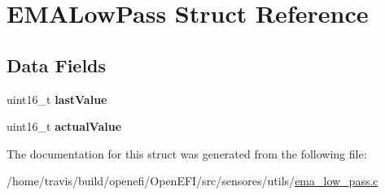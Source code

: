 \hypertarget{structEMALowPass}{}\section{E\+M\+A\+Low\+Pass Struct Reference}
\label{structEMALowPass}
\subsection*{Data Fields}
\begin{DoxyCompactItemize}
\item 
uint16\+\_\+t {\bfseries last\+Value}\hypertarget{structEMALowPass_a73f50a2d936f1cb4f1fbdd7e71fce863}{}\label{structEMALowPass_a73f50a2d936f1cb4f1fbdd7e71fce863}

\item 
uint16\+\_\+t {\bfseries actual\+Value}\hypertarget{structEMALowPass_a7747b0ecc32c8720e49bb2ca9247735b}{}\label{structEMALowPass_a7747b0ecc32c8720e49bb2ca9247735b}

\end{DoxyCompactItemize}


The documentation for this struct was generated from the following file\+:\begin{DoxyCompactItemize}
\item 
/home/travis/build/openefi/\+Open\+E\+F\+I/src/sensores/utils/\hyperlink{ema__low__pass_8c}{ema\+\_\+low\+\_\+pass.\+c}\end{DoxyCompactItemize}
